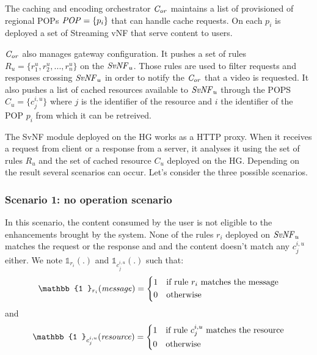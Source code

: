 The caching and encoding orchestrator  $\mathit{C_{or}}$ maintains a list of provisioned of regional POPs \(\mathit{POP}=\{p_{i}\}\) that can handle cache requests. On each $p_{i}$ is deployed a set of Streaming vNF that serve content to users.

$\mathit{C_{or}}$ also manages gateway configuration. It pushes a set of rules \(R_{u}=\{r^{u}_{1},r^{u}_{2},...,r^{u}_{n}\}\) on the $\mathit{SvNF}_{u}$. 
Those rules are used to filter requests and responses crossing $\mathit{SvNF}_{u}$ in order to notify the $\mathit{C_{or}}$ that a video is requested.
It also pushes a list of cached resources available to $\mathit{SvNF}_{u}$ through the POPS $C_{u}=\{c^{i,u}_{j} \}$ where $j$ is the identifier of the resource and $i$ the identifier of the POP $p_{i}$ from which it can be retreived.

The SvNF module deployed on the HG works as a HTTP proxy.
When it receives a request from client or a response from a server, it analyses it using the set of rules \(R_{u}\) and the set of cached resource $C_{u}$ deployed on the HG.
Depending on the result several scenarios can occur.
Let's consider the three possible scenarios.


\subsubsection*{Scenario 1: no operation scenario}\label{noop}

In this scenario, the content consumed by the user is not eligible to the enhancements brought by the system. None of the rules $r_{i}$ deployed on $\mathit{SvNF}_{u}$ matches the request or the response and and the content doesn't match any $c^{i,u}_{j}$ either. We note $\mathbb{1}_{r_{i}}(.)$ and $\mathbb{1}_{c^{i,u}_{j}}(.)$ such that:
\[
    \mathbb{1 }_{r_{i}}(\mathit{message})= 
\begin{dcases}
    1& \text{if rule $r_{i}$ matches the message} \\
    0              & \text{otherwise}
\end{dcases}
\]
and 
\[
    \mathbb{1 }_{c^{i,u}_{j}}(\mathit{resource})= 
\begin{dcases}
    1& \text{if rule $c^{i,u}_{j}$ matches the resource} \\
    0              & \text{otherwise}
\end{dcases}
\]

